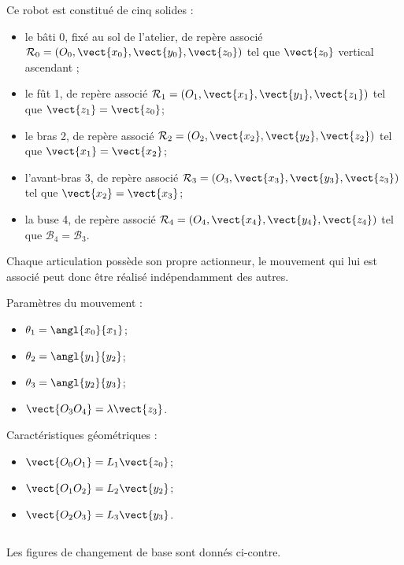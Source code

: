 Ce robot est constitué de cinq solides :
\begin{itemize}
\item le bâti 0, fixé au sol de l’atelier, de repère associé $\mathcal{R}_0=\left(O_0,\vect{x_0},\vect{y_0},\vect{z_0}\right)$ tel que $\vect{z_0}$ vertical ascendant ;
\item le fût 1, de repère associé $\mathcal{R}_1=\left(O_1,\vect{x_1},\vect{y_1},\vect{z_1}\right)$ tel que $\vect{z_1}  =\vect{z_0}$;
\item le bras 2, de repère associé $\mathcal{R}_2=\left(O_2,\vect{x_2},\vect{y_2},\vect{z_2}\right)$ tel que $\vect{x_1}  =\vect{x_2}$;
\item l’avant-bras 3, de repère associé $\mathcal{R}_3=\left(O_3,\vect{x_3},\vect{y_3},\vect{z_3}\right)$ tel que $\vect{x_2}  =\vect{x_3}$;
\item la buse 4, de repère associé $\mathcal{R}_4=\left(O_4,\vect{x_4},\vect{y_4},\vect{z_4}\right)$ tel que $\mathcal{B}_4  =\mathcal{B}_3$.
\end{itemize}


Chaque articulation possède son propre actionneur, le mouvement qui lui est associé peut donc être réalisé
indépendamment des autres.

\begin{multicols}{2}
\noindent Paramètres du mouvement :
\begin{itemize}
\item $\theta_1 = \angl{x_0}{x_1}$;
\item $\theta_2 = \angl{y_1}{y_2}$;
\item $\theta_3 = \angl{y_2}{y_3}$;
\item $\vect{O_3O_4} = \lambda \vect{z_3}$.
\end{itemize}

 \noindent  Caractéristiques géométriques :
\begin{itemize}
\item $\vect{O_0O_1} = L_1\vect{z_0}$;
\item $\vect{O_1O_2} = L_2\vect{y_2}$;
\item $\vect{O_2O_3} = L_3\vect{y_3}$.
\end{itemize}
$\quad$

\end{multicols}


Les figures de changement de base sont donnés ci-contre.


